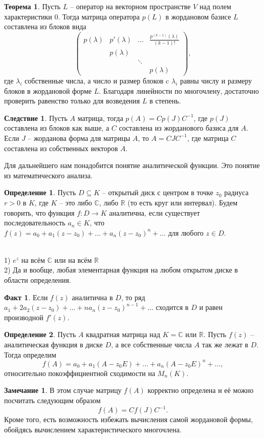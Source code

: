 \documentclass[10pt,a4paper,oneside]{book}
\theoremstyle{definition}
\newtheorem*{rem}{\color{green!50!blue}Замечание}
\newtheorem*{defn}{\color{yellow!30!red} Определение}
\newtheorem*{fact}{Факт}
\newtheorem{thm}{\color{red!40!black}Теорема}
\newtheorem{cor}{\color{green!45!black}Следствие}
\newcommand{\mb}[1]{\mathbb{#1}}
\def\exm{\noindent {\bf Примеры:}}
\def\thrm{\begin{thm}}
\def\ethrm{\end{thm}}
\def\dfn{\begin{defn}}
\def\edfn{\end{defn}}
\def\crl{\begin{cor}}
\def\ecrl{\end{cor}}
\def\rm{\begin{rem}}
\def\erm{\end{rem}}
\def\fct{\begin{fact}}
\def\efct{\end{fact}}
\def\pmat{\begin{pmatrix}}
\def\epmat{\end{pmatrix}}
\begin{document}
\thrm
Пусть $L$ -- оператор на векторном пространстве $V$ над полем характеристики $0$. Тогда матрица оператора $p(L)$ в жордановом базисе $L$ составлена из блоков вида
$$ \pmat p(\lambda) & p'(\lambda) & \dots & \frac{p^{(k-1)}(\lambda)}{(k-1)!}\\
 &  p(\lambda) & &\\
 &            & \ddots & \\
 &&&  p(\lambda) \epmat,$$
где $\lambda_i$ собственные числа, а число и размер блоков c $\lambda_i$ равны числу и размеру блоков в жордановой форме $L$.
\proof Благодаря линейности по многочлену, достаточно проверить равенство только для возведения $L$ в степень. 
\endproof
\ethrm

\crl Пусть $A$ матрица, тогда $p(A)=C p(J) C^{-1}$, где $p(J)$ составлена из блоков как выше, а $C$ составлена из жорданового базиса для $A$.
\proof Если $J$ -- жорданова форма для матрицы $A$, то $A=CJC^{-1}$, где матрица $C$ составлена из собственных векторов $A$.
\endproof
\ecrl

Для дальнейшего нам понадобится понятие аналитической функции. Это понятие из математического анализа.


\dfn Пусть $D\subseteq K$ -- открытый диск с центром в точке $z_0$ радиуса $r>0$ в $K$, где $K$ -- это либо $\mb C$, либо $\mb R$ (то есть круг или интервал). Будем говорить, что функция $f\colon D \to K$ аналитична, если существует последовательность $a_n
\in K$, что $f(z)=a_0+a_1(z-z_0)+\dots+ a_n(z-z_0)^n+\dots$ для любого $ z\in D$. 
\edfn

\exm\\
1) $e^z$ на всём $\mb C$ или на всём $\mb R$\\
2) Да и вообще, любая элементарная функция на любом открытом диске в области определения.

\fct Если $f(z)$ аналитична в $D$, то ряд $a_1+2a_2(z-z_0)+\dots+na_n(z-z_0)^{n-1}+\dots$ сходится в $D$ и равен производной $f'(z)$.
\efct

\dfn Пусть $A$ квадратная матрица над $K=\mb C$ или $\mb R$.  Пусть $f(z)$ -- аналитическая функция в диске $D$, а все собственные числа $A$ так же лежат в $D$. Тогда определим 
$$f(A)=a_0+a_1(A-z_0E)+\dots+a_n(A-z_0E)^n+\dots,$$
относительно покоэффициентной сходимости на $M_n(K)$.
\edfn






\rm  В этом случае матрицу $f(A)$ корректно определена и её можно посчитать следующим образом
$$f(A)= C f(J) C^{-1}.$$
Кроме того, есть возможность избежать вычисления самой жордановой формы,  обойдясь вычислением характеристического многочлена.
\erm
\end{document}
